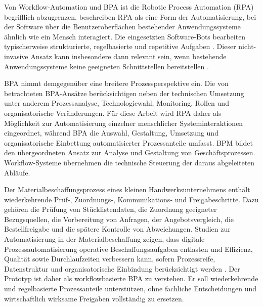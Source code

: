 \documentclass[a4paper,12pt]{article}
\begin{document}
Von Workflow-Automation und BPA ist die Robotic Process Automation (RPA) begrifflich abzugrenzen. \textcite{van_der_aalst_robotic_2018} beschreiben RPA als eine Form der Automatisierung, bei der Software über die Benutzeroberflächen bestehender Anwendungssysteme ähnlich wie ein Mensch interagiert. Die eingesetzten Software-Bots bearbeiten typischerweise strukturierte, regelbasierte und repetitive Aufgaben \parencite{syed_robotic_2020}. Dieser nicht-invasive Ansatz kann insbesondere dann relevant sein, wenn bestehende Anwendungssysteme keine geeigneten Schnittstellen bereitstellen \parencite{syed_robotic_2020}.

BPA nimmt demgegenüber eine breitere Prozessperspektive ein. Die von \textcite{moreira_business_2024} betrachteten BPA-Ansätze berücksichtigen neben der technischen Umsetzung unter anderem Prozessanalyse, Technologiewahl, Monitoring, Rollen und organisatorische Veränderungen. Für diese Arbeit wird RPA daher als Möglichkeit zur Automatisierung einzelner menschlicher Systeminteraktionen eingeordnet, während BPA die Auswahl, Gestaltung, Umsetzung und organisatorische Einbettung automatisierter Prozessanteile umfasst. BPM bildet den übergeordneten Ansatz zur Analyse und Gestaltung von Geschäftsprozessen. Workflow-Systeme übernehmen die technische Steuerung der daraus abgeleiteten Abläufe.

Der Materialbeschaffungsprozess eines kleinen Handwerksunternehmens enthält wiederkehrende Prüf-, Zuordnungs-, Kommunikations- und Freigabeschritte. Dazu gehören die Prüfung von Stücklistendaten, die Zuordnung geeigneter Bezugsquellen, die Vorbereitung von Anfragen, der Angebotsvergleich, die Bestellfreigabe und die spätere Kontrolle von Abweichungen. Studien zur Automatisierung in der Materialbeschaffung zeigen, dass digitale Prozessautomatisierung operative Beschaffungsaufgaben entlasten und Effizienz, Qualität sowie Durchlaufzeiten verbessern kann, sofern Prozessreife, Datenstruktur und organisatorische Einbindung berücksichtigt werden \parencite{flechsig_robotic_2022,santos_rebooting_2025,viale_impact_2020}. Der Prototyp ist daher als workflowbasierte BPA zu verstehen. Er soll wiederkehrende und regelbasierte Prozessanteile unterstützen, ohne fachliche Entscheidungen und wirtschaftlich wirksame Freigaben vollständig zu ersetzen.
\end{document}
